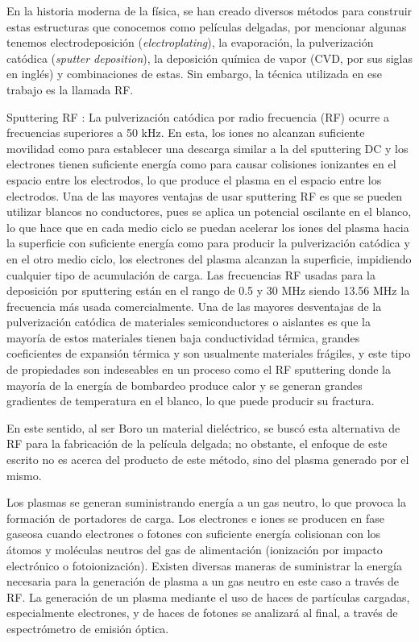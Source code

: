 \documentclass[12pt]{IEEEtran}
\begin{document}
En la historia moderna de la física, se han creado diversos métodos para construir estas estructuras que conocemos como películas delgadas, por mencionar algunas tenemos electrodeposición (\emph{electroplating}), la evaporación, la pulverización catódica (\emph{sputter deposition}), la deposición química de vapor  (CVD, por sus siglas en inglés) y combinaciones de estas. Sin embargo, la técnica utilizada en ese trabajo es la llamada RF.

Sputtering RF \cite{mastertesis2017}: La pulverización catódica por radio frecuencia (RF) ocurre a frecuencias superiores a 50 kHz. En esta, los iones no alcanzan suficiente movilidad como para establecer una descarga similar a la del sputtering DC y los electrones tienen suficiente energía como para causar colisiones ionizantes en el espacio entre los electrodos, lo que produce el plasma en el espacio entre los electrodos. Una de las mayores ventajas de usar sputtering RF es que se pueden utilizar blancos no conductores, pues se aplica un potencial oscilante en el blanco, lo que hace que en cada medio ciclo se puedan acelerar los iones del plasma hacia la superficie con suficiente energía como para producir la pulverización catódica y en el otro medio ciclo, los electrones del plasma alcanzan la superficie, impidiendo cualquier tipo de acumulación de carga. Las frecuencias RF usadas para la deposición por sputtering están en el rango de 0.5 y 30 MHz siendo 13.56 MHz la frecuencia más usada comercialmente. Una de las mayores desventajas de la pulverización catódica de materiales semiconductores o aislantes es que la mayoría de estos materiales tienen baja conductividad térmica, grandes coeficientes de expansión térmica y son usualmente materiales frágiles, y este tipo de propiedades son indeseables en un proceso como el RF sputtering donde la mayoría de la energía de bombardeo produce calor y se generan grandes gradientes de temperatura en el blanco, lo que puede producir su fractura.

En este sentido, al ser Boro un material dieléctrico, se buscó esta alternativa de RF para la fabricación de la película delgada; no obstante, el enfoque de este escrito no es acerca del producto de este método, sino del plasma generado por el mismo.

Los plasmas \cite{plasmaaaaa} se generan suministrando energía a un gas neutro, lo que provoca la formación de portadores de carga. Los electrones e iones se producen en fase gaseosa cuando electrones o fotones con suficiente energía colisionan con los átomos y moléculas neutros del gas de alimentación (ionización por impacto electrónico o fotoionización). Existen diversas maneras de suministrar la energía necesaria para la generación de plasma a un gas neutro en este caso a través de RF. La generación de un plasma mediante el uso de haces de partículas cargadas, especialmente electrones, y de haces de fotones se analizará al final, a través de espectrómetro de emisión óptica.
\end{document}
